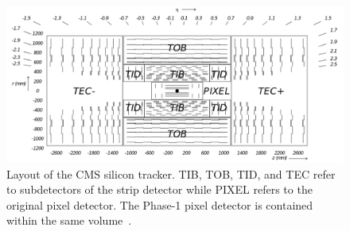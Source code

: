 \begin{figure}
\centering
\includegraphics[width=\textwidth]{figures/lhc_and_cms/tracker_layout.png}
\caption{Layout of the CMS silicon tracker. TIB, TOB, TID, and TEC refer to subdetectors of the strip detector while PIXEL refers to the original pixel detector. The Phase-1 pixel detector is contained within the same volume~\cite{cms_experiment}.}
\label{tracker_layout}
\end{figure}